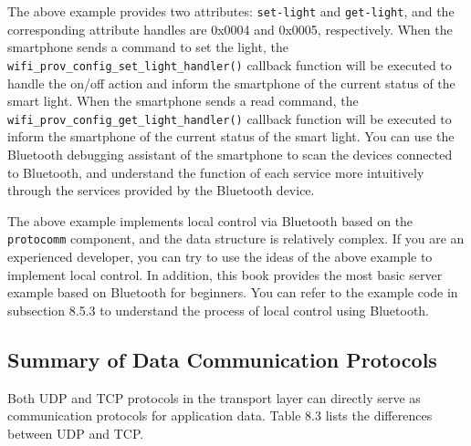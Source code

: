 \documentclass[a4paper,12pt,openany]{book}
\begin{document}
The above example provides two attributes: \verb|set-light| and \verb|get-light|, and the corresponding attribute handles are 0x0004 and 0x0005, respectively. When the smartphone sends a command to set the light, the \verb|wifi_prov_config_set_light_handler()| callback function will be executed to handle the on/off action and inform the smartphone of the current status of the smart light. When the smartphone sends a read command, the \verb|wifi_prov_config_get_light_handler()| callback function will be executed to inform the smartphone of the current status of the smart light. You can use the Bluetooth debugging assistant of the smartphone to scan the devices connected to Bluetooth, and understand the function of each service more intuitively through the services provided by the Bluetooth device.

The above example implements local control via Bluetooth based on the \verb|protocomm| component, and the data structure is relatively complex. If you are an experienced developer, you can try to use the ideas of the above example to implement local control. In addition, this book provides the most basic server example based on Bluetooth for beginners. You can refer to the example code in subsection 8.5.3 to understand the process of local control using Bluetooth.

\subsection{Summary of Data Communication Protocols}
Both UDP and TCP protocols in the transport layer can directly serve as communication protocols for application data. Table 8.3 lists the differences between UDP and TCP.
\end{document}
